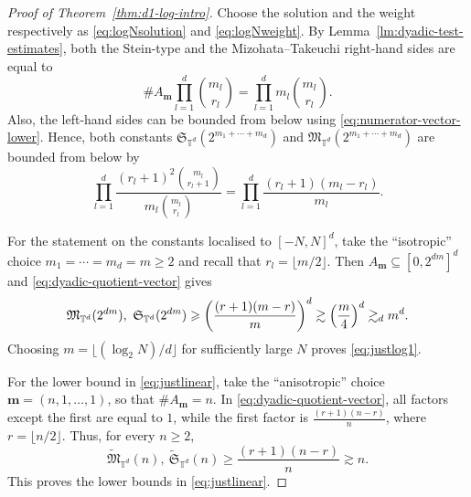 \documentclass[10pt,a4paper]{amsart}
\numberwithin{equation}{section}
\renewcommand{\geq}{\geqslant}
\renewcommand{\ge}{\geqslant}
\begin{document}
\begin{proof}[Proof of Theorem~\ref{thm:d1-log-intro}]
Choose the solution and the weight respectively as \eqref{eq:logNsolution} and \eqref{eq:logNweight}.
By Lemma~\ref{lm:dyadic-test-estimates}, both the Stein-type and the Mizohata--Takeuchi right-hand sides are equal to
\[ \#A_{\mathbf{m}}\prod_{l=1}^d\binom{m_l}{r_l} = \prod_{l=1}^d m_l\binom{m_l}{r_l}. \]
Also, the left-hand sides can be bounded from below using \eqref{eq:numerator-vector-lower}. Hence, both constants $\mathfrak{S}_{\mathbb{T}^d}(2^{m_{1}+\cdots+m_{d}})$ and $\mathfrak{M}_{\mathbb{T}^d}(2^{m_{1}+\cdots+m_{d}})$ are bounded from below by
\begin{equation}\label{eq:dyadic-quotient-vector}
\prod_{l=1}^d \frac{(r_l+1)^2\binom{m_l}{r_l+1}}{m_l\binom{m_l}{r_l}} = \prod_{l=1}^d \frac{(r_l+1)(m_l-r_l)}{m_l}.
\end{equation}

For the statement on the constants localised to $[-N,N]^d$, take the ``isotropic'' choice $m_1=\cdots=m_d=m\geq2$ and recall that $r_l=\lfloor m/2\rfloor$. Then $A_{\mathbf{m}}\subseteq[0,2^{dm}]^d$ and \eqref{eq:dyadic-quotient-vector} gives
\[ \mathfrak{M}_{\mathbb{T}^d}(2^{dm}),\ \mathfrak{S}_{\mathbb{T}^d}(2^{dm}) \ge \biggl(\frac{(r+1)(m-r)}{m}\biggr)^d \gtrsim \Bigl(\frac{m}{4}\Bigr)^d \gtrsim_d m^d. \]
Choosing $m =\lfloor (\log_2 N)/d \rfloor$ for sufficiently large $N$ proves \eqref{eq:justlog1}.

For the lower bound in \eqref{eq:justlinear}, take the ``anisotropic'' choice $\mathbf{m}=(n,1,\ldots,1)$, so that $\#A_{\mathbf{m}}=n$. In \eqref{eq:dyadic-quotient-vector}, all factors except the first are equal to $1$, while the first factor is $\frac{(r+1)(n-r)}{n}$, where $r=\lfloor n/2\rfloor$.
Thus, for every $n\ge2$,
\[ \widetilde{\mathfrak{M}}_{\mathbb{T}^d}(n),\ \widetilde{\mathfrak{S}}_{\mathbb{T}^d}(n) \ge \frac{(r+1)(n-r)}{n} \gtrsim n. \]
This proves the lower bounds in \eqref{eq:justlinear}. 


\end{proof}
\end{document}

